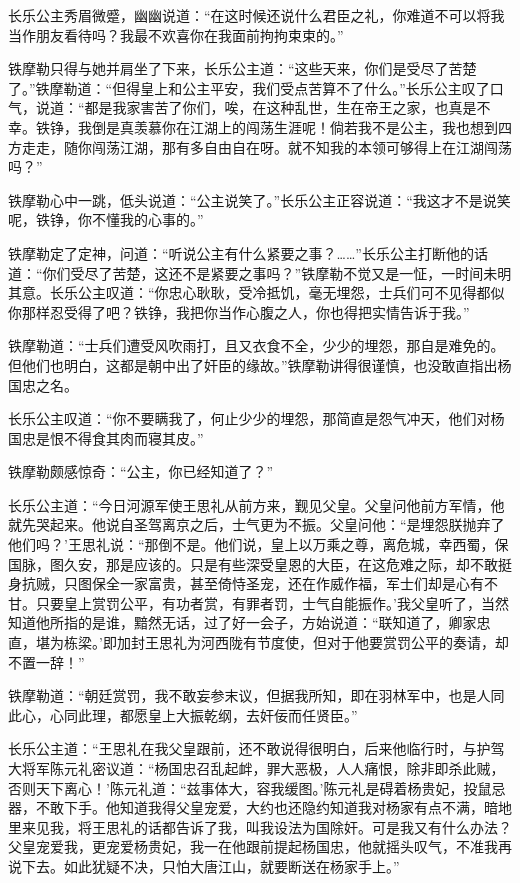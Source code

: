 \documentclass[12pt,oneside]{book}
\begin{document}
长乐公主秀眉微蹙，幽幽说道：``在这时候还说什么君臣之礼，你难道不可以将我当作朋友看待吗？我最不欢喜你在我面前拘拘束束的。''

铁摩勒只得与她并肩坐了下来，长乐公主道：``这些天来，你们是受尽了苦楚了。''铁摩勒道：``但得皇上和公主平安，我们受点苦算不了什么。''长乐公主叹了口气，说道：``都是我家害苦了你们，唉，在这种乱世，生在帝王之家，也真是不幸。铁铮，我倒是真羡慕你在江湖上的闯荡生涯呢！倘若我不是公主，我也想到四方走走，随你闯荡江湖，那有多自由自在呀。就不知我的本领可够得上在江湖闯荡吗？''

铁摩勒心中一跳，低头说道：``公主说笑了。''长乐公主正容说道：``我这才不是说笑呢，铁铮，你不懂我的心事的。''

铁摩勒定了定神，问道：``听说公主有什么紧要之事？\ldots\ldots{}''长乐公主打断他的话道：``你们受尽了苦楚，这还不是紧要之事吗？''铁摩勒不觉又是一怔，一时间未明其意。长乐公主叹道：``你忠心耿耿，受冷抵饥，毫无埋怨，士兵们可不见得都似你那样忍受得了吧？铁铮，我把你当作心腹之人，你也得把实情告诉于我。''

铁摩勒道：``士兵们遭受风吹雨打，且又衣食不全，少少的埋怨，那自是难免的。但他们也明白，这都是朝中出了奸臣的缘故。''铁摩勒讲得很谨慎，也没敢直指出杨国忠之名。

长乐公主叹道：``你不要瞒我了，何止少少的埋怨，那简直是怨气冲天，他们对杨国忠是恨不得食其肉而寝其皮。''

铁摩勒颇感惊奇：``公主，你已经知道了？''

长乐公主道：``今日河源军使王思礼从前方来，觐见父皇。父皇问他前方军情，他就先哭起来。他说自圣驾离京之后，士气更为不振。父皇问他：``是埋怨朕抛弃了他们吗？'王思礼说：``那倒不是。他们说，皇上以万乘之尊，离危城，幸西蜀，保国脉，图久安，那是应该的。只是有些深受皇恩的大臣，在这危难之际，却不敢挺身抗贼，只图保全一家富贵，甚至倚恃圣宠，还在作威作福，军士们却是心有不甘。只要皇上赏罚公平，有功者赏，有罪者罚，士气自能振作。'我父皇听了，当然知道他所指的是谁，黯然无话，过了好一会子，方始说道：``联知道了，卿家忠直，堪为栋梁。'即加封王思礼为河西陇有节度使，但对于他要赏罚公平的奏请，却不置一辞！''

铁摩勒道：``朝廷赏罚，我不敢妄参末议，但据我所知，即在羽林军中，也是人同此心，心同此理，都愿皇上大振乾纲，去奸佞而任贤臣。''

长乐公主道：``王思礼在我父皇跟前，还不敢说得很明白，后来他临行时，与护驾大将军陈元礼密议道：``杨国忠召乱起衅，罪大恶极，人人痛恨，除非即杀此贼，否则天下离心！'陈元礼道：``兹事体大，容我缓图。'陈元礼是碍着杨贵妃，投鼠忌器，不敢下手。他知道我得父皇宠爱，大约也还隐约知道我对杨家有点不满，暗地里来见我，将王思礼的话都告诉了我，叫我设法为国除奸。可是我又有什么办法？父皇宠爱我，更宠爱杨贵妃，我一在他跟前提起杨国忠，他就摇头叹气，不准我再说下去。如此犹疑不决，只怕大唐江山，就要断送在杨家手上。''
\end{document}
